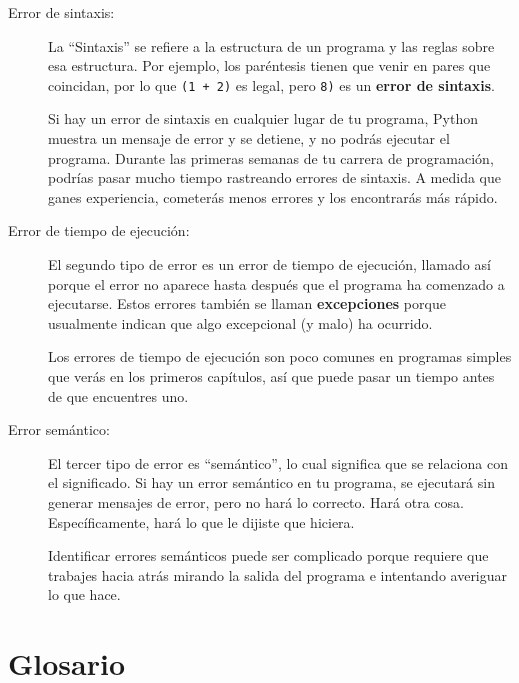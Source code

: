 \documentclass[10pt]{book}
\begin{document}
\begin{description}

\item[Error de sintaxis:] La ``Sintaxis'' se refiere a la estructura de un programa
  y las reglas sobre esa estructura.  Por ejemplo, los paréntesis tienen
  que venir en pares que coincidan, por lo que {\tt (1 + 2)} es legal, pero {\tt 8)}
  es un {\bf error de sintaxis}.   

Si hay un error de sintaxis
en cualquier lugar de tu programa, Python muestra un mensaje de error y se detiene,
y no podrás ejecutar el programa.  Durante las primeras
semanas de tu carrera de programación, podrías pasar mucho
tiempo rastreando errores de sintaxis.  A medida que ganes experiencia,
cometerás menos errores y los encontrarás más rápido.


\item[Error de tiempo de ejecución:] El segundo tipo de error es un error de tiempo de ejecución,
  llamado así porque el error no aparece hasta después que el programa ha
  comenzado a ejecutarse.  Estos errores también se llaman {\bf excepciones}
  porque usualmente indican que algo excepcional (y malo)
  ha ocurrido.   
    

Los errores de tiempo de ejecución son poco comunes en programas simples que verás en los
primeros capítulos, así que puede pasar un tiempo antes de que encuentres uno.


\item[Error semántico:] El tercer tipo de error es ``semántico'', lo cual
  significa que se relaciona con el significado.  Si hay un error semántico en tu
  programa, se ejecutará sin generar mensajes de error, pero
  no hará lo correcto.  Hará otra cosa.  Específicamente,
  hará lo que le dijiste que hiciera.  
   

Identificar errores semánticos puede ser complicado porque requiere que trabajes
hacia atrás mirando la salida del programa e intentando averiguar
lo que hace.

\end{description}


\section{Glosario}
\end{document}

